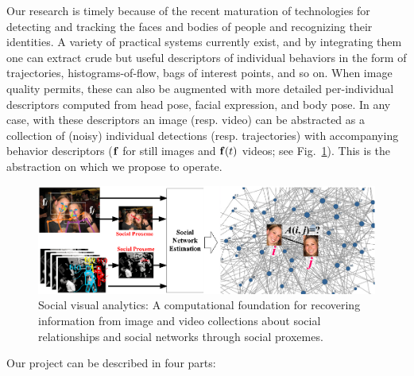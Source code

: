 Our research is timely because of the recent maturation of technologies for detecting and tracking the faces and bodies of people and recognizing their identities. A variety of practical systems currently exist, and by integrating them one can extract crude but useful descriptors of individual behaviors in the form of trajectories, histograms-of-flow, bags of interest points, and so on. When image quality permits, these can also be augmented with more detailed per-individual descriptors computed from head pose, facial expression, and body pose. In any case, with these descriptors an image (resp. video) can be abstracted as a collection of (noisy) individual detections (resp. trajectories) with accompanying behavior descriptors (${\bf f}$ for still images and ${\bf f}(t)$ videos; see Fig.~\ref{fig:intro}). This is the abstraction on which we propose to operate.

\begin{figure}[t!]
\begin{center}
\includegraphics[width=\columnwidth]{intro_2014}
\end{center}
\vspace{-0.25in} \caption{\captionsize 
Social visual analytics: A computational foundation for recovering information from image and video collections about social relationships and social networks through social proxemes. \label{fig:intro}\afterfigspace}
\end{figure}

Our project can be described in four parts:


